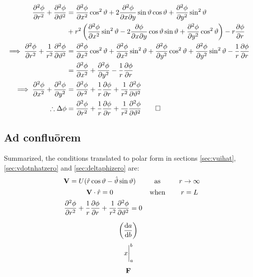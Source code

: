 \documentclass[a4paper,12pt]{article}
\newcommand{\rhat}{\hat{r}}
\newcommand{\thetahat}{\hat{\theta}}
\renewcommand{\theta}{\vartheta}      		%
\newcommand{\partialder}[2]{\frac{\partial #1}{\partial #2}}        %
\newcommand{\vecpadding}{\vspace*{0.15cm}}										%
\begin{document}
\begin{align}
	\notag\frac{\partial^2\phi}{\partial r^2}+\frac{\partial^2\phi}{\partial\theta^2}&=\frac{\partial^2\phi}{\partial x^2}\cos^2\theta+2\frac{\partial^2\phi}{\partial x\partial y}\sin\theta\cos\theta+\frac{\partial^2\phi}{\partial y^2}\sin^2\theta\\
	\notag&+r^2\left(\frac{\partial^2\phi}{\partial x^2}\sin^2\theta-2\frac{\partial\phi}{\partial x\partial y}\cos\theta\sin\theta+\frac{\partial^2\phi}{\partial y^2}\cos^2\theta\right)-r\partialder{\phi}{r}\\
	\notag\implies\frac{\partial^2\phi}{\partial r^2}+\frac{1}{r^2}\frac{\partial^2\phi}{\partial\theta^2}&=\frac{\partial^2\phi}{\partial x^2}\cos^2\theta+\frac{\partial^2\phi}{\partial x^2}\sin^2\theta+\frac{\partial^2\phi}{\partial y^2}\cos^2\theta+\frac{\partial^2\phi}{\partial y^2}\sin^2\theta-\frac{1}{r}\partialder{\phi}{r}\\
	\notag&=\frac{\partial^2\phi}{\partial x^2}+\frac{\partial^2\phi}{\partial y^2}-\frac{1}{r}\partialder{\phi}{r}\\
	\notag\implies\frac{\partial^2\phi}{\partial x^2}+\frac{\partial^2\phi}{\partial y^2}&=\frac{\partial^2\phi}{\partial r^2}+\frac{1}{r}\partialder{\phi}{r}+\frac{1}{r^2}\frac{\partial^2\phi}{\partial\theta^2}\\
	\label{polap:final}\therefore\Delta\phi&=\frac{\partial^2\phi}{\partial r^2}+\frac{1}{r}\partialder{\phi}{r}+\frac{1}{r^2}\frac{\partial^2\phi}{\partial\theta^2}\qed
\end{align}

\subsection{Ad confluōrem}
Summarized, the conditions translated to polar form in sections \ref{sec:vuihat}, \ref{sec:vdotnhatzero} and \ref{sec:deltaphizero} are:
$$\begin{matrix}
	&\mathbf{V}=U(\rhat\cos\theta-\thetahat\sin\theta)\quad&\text{as}\quad&r\rightarrow\infty\vecpadding\\
	&\mathbf{V}\cdot\rhat=0\quad&\text{when}\quad&r=L\vecpadding\\
	&\dfrac{\partial^2\phi}{\partial r^2}+\dfrac{1}{r}\dfrac{\partial\phi}{\partial r}+\dfrac{1}{r^2}\dfrac{\partial^2\phi}{\partial\theta^2}=0
\end{matrix}$$


$$\qty(\dv{a}{b})$$
$$\eval{x}_{a}^{b}$$
$$\vb{F}$$
\end{document}
